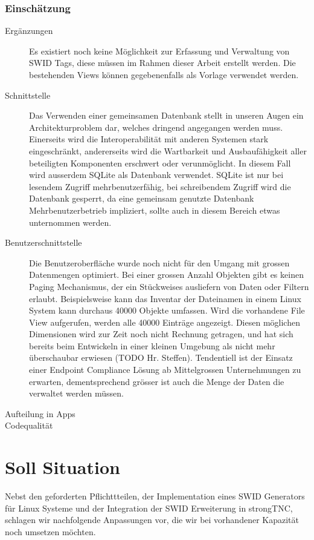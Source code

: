 \subsubsection{Einschätzung}
\begin{description}
	\item[Ergänzungen] Es existiert noch keine Möglichkeit zur Erfassung und
	Verwaltung von SWID Tags, diese müssen im Rahmen dieser Arbeit erstellt werden.
	Die bestehenden Views können gegebenenfalls als Vorlage verwendet werden.
	
	\item[Schnittstelle] Das Verwenden einer gemeinsamen Datenbank stellt in unseren
	Augen ein Architekturproblem dar, welches dringend angegangen werden muss.
	Einerseits wird die Interoperabilität mit anderen Systemen stark eingeschränkt,
	andererseits wird die Wartbarkeit und Ausbaufähigkeit aller beteiligten
	Komponenten erschwert oder verunmöglicht. In diesem Fall wird ausserdem SQLite
	als Datenbank verwendet. SQLite ist nur bei lesendem Zugriff mehrbenutzerfähig,
	bei schreibendem Zugriff wird die Datenbank gesperrt, da eine gemeinsam
	genutzte Datenbank Mehrbenutzerbetrieb impliziert, sollte auch in diesem Bereich
	etwas unternommen werden. 
	
	\item[Benutzerschnittstelle] 
	Die Benutzeroberfläche wurde noch nicht für den Umgang mit grossen Datenmengen
	optimiert. Bei einer grossen Anzahl Objekten gibt es keinen Paging Mechanismus,
	der ein Stückweises ausliefern von Daten oder Filtern erlaubt. Beispielsweise
	kann das Inventar der Dateinamen in einem Linux System kann durchaus 40000
	Objekte umfassen. Wird die vorhandene File View aufgerufen, werden alle 40000
	Einträge angezeigt. Diesen möglichen Dimensionen wird zur Zeit noch nicht
	Rechnung getragen, und hat sich bereits beim Entwickeln in einer kleinen
	Umgebung als nicht mehr überschaubar erwiesen (TODO Hr. Steffen). Tendentiell
	ist der Einsatz einer Endpoint Compliance Lösung ab Mittelgrossen
	Unternehmungen zu erwarten, dementsprechend grösser ist auch die Menge der
	Daten die verwaltet werden müssen.

\item[Aufteilung in Apps] 
	
	\item[Codequalität]
	
	
\end{description}

\section{Soll Situation} Nebst den geforderten Pflichttteilen, der
	Implementation eines SWID Generators für Linux Systeme und der Integration der
	SWID Erweiterung in strongTNC, schlagen wir nachfolgende Anpassungen vor, die
	wir bei vorhandener Kapazität noch umsetzen möchten.

